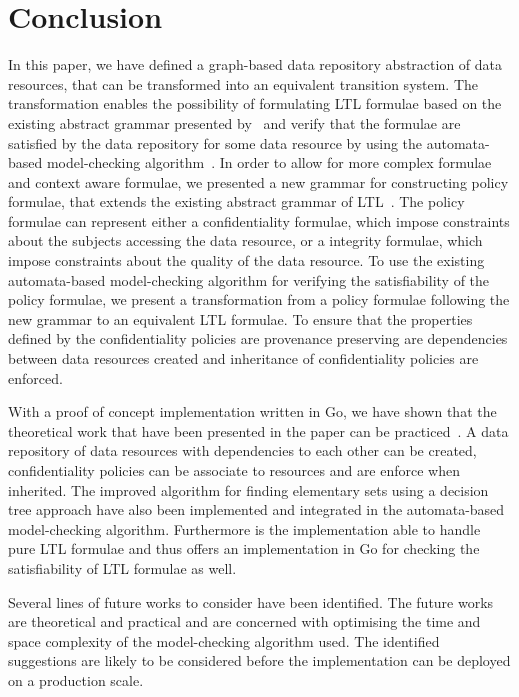 \section{Conclusion}
In this paper, we have defined a graph-based data repository abstraction of data resources, that can be transformed into an equivalent transition system. The transformation enables the possibility of formulating LTL formulae based on the existing abstract grammar presented by~\cite{baier2008principles} and verify that the formulae are satisfied by the data repository for some data resource by using the automata-based model-checking algorithm~\cite{baier2008principles}. In order to allow for more complex formulae and context aware formulae, we presented a new grammar for constructing policy formulae, that extends the existing abstract grammar of LTL~\cite{baier2008principles}. The policy formulae can represent either a confidentiality formulae, which impose constraints about the subjects accessing the data resource, or a integrity formulae, which impose constraints about the quality of the data resource. To use the existing automata-based model-checking algorithm for verifying the satisfiability of the policy formulae, we present a transformation from a policy formulae following the new grammar to an equivalent LTL formulae. To ensure that the properties defined by the confidentiality policies are provenance preserving are dependencies between data resources created and inheritance of confidentiality policies are enforced.

With a proof of concept implementation written in Go, we have shown that the theoretical work that have been presented in the paper can be practiced~\cite{}. A data repository of data resources with dependencies to each other can be created, confidentiality policies can be associate to resources and are enforce when inherited. The improved algorithm for finding elementary sets using a decision tree approach have also been implemented and integrated in the automata-based model-checking algorithm. Furthermore is the implementation able to handle pure LTL formulae and thus offers an implementation in Go for checking the satisfiability of LTL formulae as well.

Several lines of future works to consider have been identified. The future works are theoretical and practical and are concerned with optimising the time and space complexity of the model-checking algorithm used. The identified suggestions are likely to be considered before the implementation can be deployed on a production scale.
